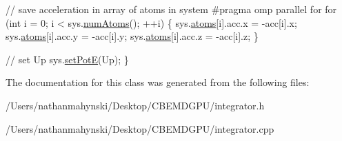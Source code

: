 \begin{DoxyCode}
    \textcolor{comment}{// save acceleration in array of atoms in system}
\textcolor{preprocessor}{    #pragma omp parallel for}
\textcolor{preprocessor}{}    \textcolor{keywordflow}{for} (\textcolor{keywordtype}{int} i = 0; i < sys.\hyperlink{classsystem_definition_ae8d3c2df2d56241cee03fcc4e2026ae0}{numAtoms}(); ++i) \{
        sys.\hyperlink{classsystem_definition_ae8814d3f60fc1111af2a3f218a4bfcab}{atoms}[i].acc.x = -acc[i].x;
        sys.\hyperlink{classsystem_definition_ae8814d3f60fc1111af2a3f218a4bfcab}{atoms}[i].acc.y = -acc[i].y;
        sys.\hyperlink{classsystem_definition_ae8814d3f60fc1111af2a3f218a4bfcab}{atoms}[i].acc.z = -acc[i].z;
    \}
    
    \textcolor{comment}{// set Up}
    sys.\hyperlink{classsystem_definition_a92a7d6457bd3f7ce71088e4df8e9ff4b}{setPotE}(Up);
\}
\end{DoxyCode}


The documentation for this class was generated from the following files\-:\begin{DoxyCompactItemize}
\item 
/\-Users/nathanmahynski/\-Desktop/\-C\-B\-E\-M\-D\-G\-P\-U/integrator.\-h\item 
/\-Users/nathanmahynski/\-Desktop/\-C\-B\-E\-M\-D\-G\-P\-U/integrator.\-cpp\end{DoxyCompactItemize}
